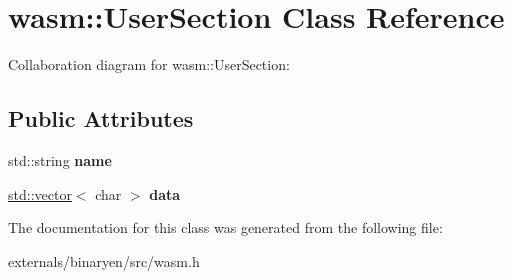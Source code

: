 \hypertarget{classwasm_1_1_user_section}{}\section{wasm\+:\+:User\+Section Class Reference}
\label{classwasm_1_1_user_section}


Collaboration diagram for wasm\+:\+:User\+Section\+:
\subsection*{Public Attributes}
\begin{DoxyCompactItemize}
\item 
\mbox{\label{classwasm_1_1_user_section_aa5fceb2739e14a996ab6a94e19b13cfb}} 
std\+::string {\bfseries name}
\item 
\mbox{\label{classwasm_1_1_user_section_ad31ea58c67fa319da6c75c4463a06b1c}} 
\mbox{\hyperlink{classstd_1_1vector}{std\+::vector}}$<$ char $>$ {\bfseries data}
\end{DoxyCompactItemize}


The documentation for this class was generated from the following file\+:\begin{DoxyCompactItemize}
\item 
externals/binaryen/src/wasm.\+h\end{DoxyCompactItemize}
